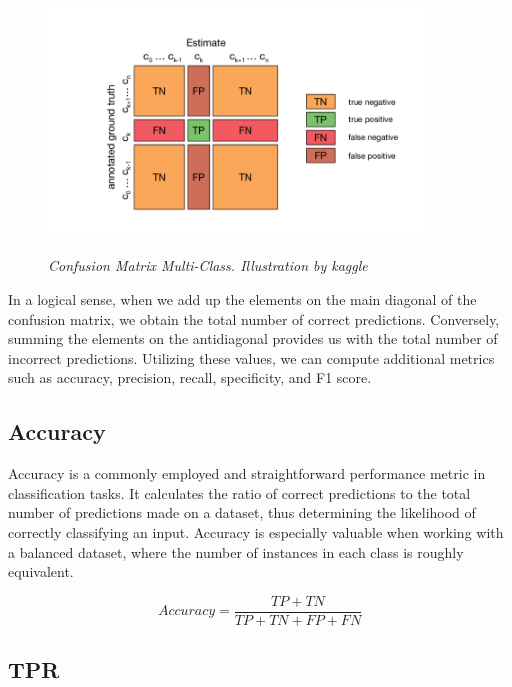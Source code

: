 \begin{figure}[H]
  \begin{adjustbox}{trim={0pt 0.5cm 0pt 1cm}, clip}
    \centering
    \includegraphics[width=0.9\textwidth]{imatges/preliminaries/confusion-matrix.png}
  \end{adjustbox}
  \caption[Confusion Matrix Multi-Class]{\textit{Confusion Matrix Multi-Class. Illustration by kaggle}}
  {\label{fig:confusion-matrix}}
\end{figure}

In a logical sense, when we add up the elements on the main diagonal of the
confusion matrix, we obtain the total number of correct predictions.
Conversely, summing the elements on the antidiagonal provides us with the total
number of incorrect predictions. Utilizing these values, we can compute
additional metrics such as accuracy, precision, recall, specificity, and F1
score.

\subsection{Accuracy}

Accuracy is a commonly employed and straightforward performance metric in
classification tasks. It calculates the ratio of correct predictions to the
total number of predictions made on a dataset, thus determining the likelihood
of correctly classifying an input. Accuracy is especially valuable when working
with a balanced dataset, where the number of instances in each class is roughly
equivalent.

\[Accuracy = \frac{TP + TN}{TP + TN + FP + FN}\]

\subsection{TPR}

